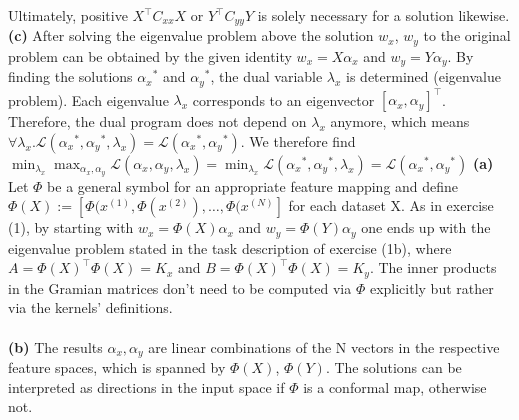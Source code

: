 \documentclass[a4paper]{article}
\newcommand{\Yt}{{Y^\top}}
\newcommand{\Xt}{{X^\top}}
\newcommand{\lx}{{\lambda_{x}}}
\newcommand{\wx}{{w_{x}}}
\newcommand{\wy}{{w_{y}}}
\newcommand{\ax}{{\alpha_{x}}}
\newcommand{\ay}{{\alpha_{y}}}
\newcommand{\Cxx}{C_{xx}}
\newcommand{\Cyy}{C_{yy}}
\newcommand{\1}{\mathds{1}}
\newcommand{\lag}{\mathcal{L}}
\begin{document}
Ultimately, positive 
$\Xt\Cxx X$ or $\Yt\Cyy Y$ is solely necessary for a solution likewise.\\
\textbf{(c)} After solving the eigenvalue problem above the solution $\wx$, $\wy$ 
to the original problem can be obtained by the given identity 
$\wx = X\ax$ and $\wy = Y\ay$. 
By finding the solutions $\ax^*$ and $\ay^*$, the dual variable $\lx$
is determined (eigenvalue problem). Each eigenvalue $\lx$ corresponds 
to an eigenvector $[\ax,\ay]^\top$. 
Therefore, the dual program does not depend on $\lx$ anymore, which means 
$\forall\lx . \lag(\ax^*,\ay^*,\lx) = \lag(\ax^*,\ay^*)$. 
We therefore find
$ 
\min_\lx \max_{\ax,\ay} \lag(\ax,\ay,\lx) 
= \min_\lx \lag(\ax^*,\ay^*,\lx) 
= \lag(\ax^*,\ay^*) 
$
\newpage
{}
\textbf{(a)} Let $\Phi$ be a general symbol for an appropriate feature mapping and 
define $\Phi(X) := [\Phi(x^{(1)}, \Phi(x^{(2)}), \ldots, \Phi(x^{(N)}]$ for each 
dataset X. As in exercise (1), by starting with $w_x = \Phi(X)\ax$ and 
$w_y = \Phi(Y)\ay$ one ends up with the eigenvalue problem stated in the task 
description of exercise (1b), where $A = \Phi(X)^\top \Phi(X) = K_x$ and
$B = \Phi(X)^\top \Phi(X) = K_y$. The inner products in the Gramian matrices 
don't need to be computed via $\Phi$ explicitly but rather via the kernels' 
definitions. \\
\\
\textbf{(b)} 
The results $\ax, \ay$ are linear combinations of the N vectors in the respective 
feature spaces, which is spanned by $\Phi(X)$, $\Phi(Y)$. The solutions can be interpreted as directions in the input space 
if $\Phi$ is a conformal map, otherwise not.    
\end{document}
